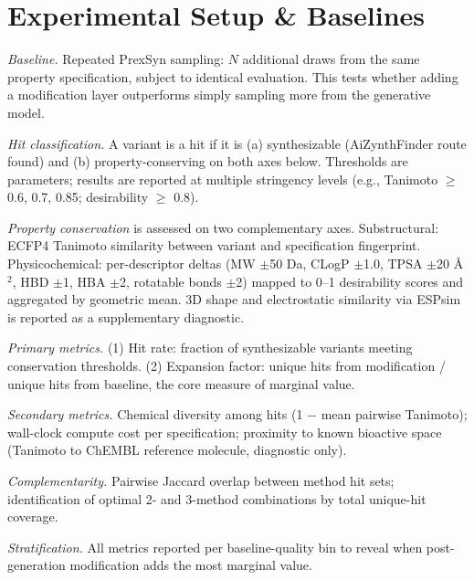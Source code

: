 \section*{Experimental Setup \& Baselines}

\textit{Baseline.} Repeated PrexSyn sampling: $N$ additional draws from the same property specification, subject to identical evaluation. This tests whether adding a modification layer outperforms simply sampling more from the generative model.

\textit{Hit classification.} A variant is a hit if it is (a) synthesizable (AiZynthFinder route found) and (b) property-conserving on both axes below. Thresholds are parameters; results are reported at multiple stringency levels (e.g., Tanimoto $\geq$ 0.6, 0.7, 0.85; desirability $\geq$ 0.8).

\textit{Property conservation} is assessed on two complementary axes. Substructural: ECFP4 Tanimoto similarity between variant and specification fingerprint. Physicochemical: per-descriptor deltas (MW $\pm$50 Da, CLogP $\pm$1.0, TPSA $\pm$20 Å$^2$, HBD $\pm$1, HBA $\pm$2, rotatable bonds $\pm$2) mapped to 0--1 desirability scores and aggregated by geometric mean. 3D shape and electrostatic similarity via ESPsim \cite{bib12} is reported as a supplementary diagnostic.

\textit{Primary metrics.} (1) Hit rate: fraction of synthesizable variants meeting conservation thresholds. (2) Expansion factor: unique hits from modification / unique hits from baseline, the core measure of marginal value.

\textit{Secondary metrics.} Chemical diversity among hits (1 $-$ mean pairwise Tanimoto); wall-clock compute cost per specification; proximity to known bioactive space (Tanimoto to ChEMBL reference molecule, diagnostic only).

\textit{Complementarity.} Pairwise Jaccard overlap between method hit sets; identification of optimal 2- and 3-method combinations by total unique-hit coverage.

\textit{Stratification.} All metrics reported per baseline-quality bin to reveal when post-generation modification adds the most marginal value.
